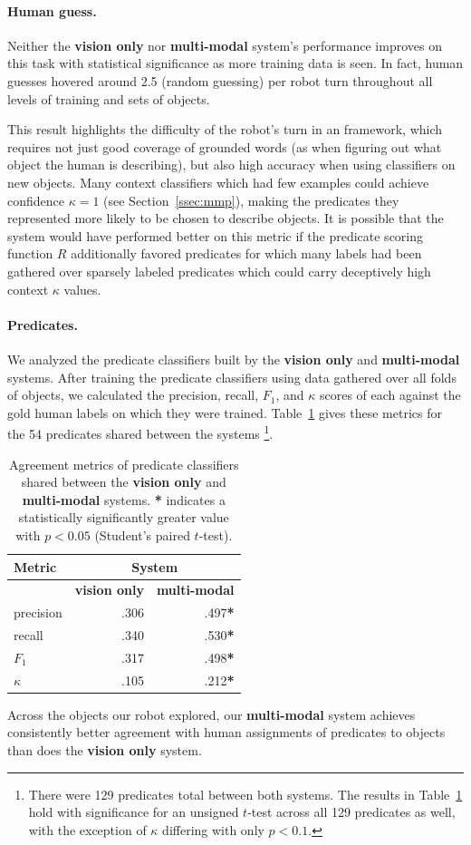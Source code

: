 \paragraph{Human guess.}
Neither the \textbf{vision only} nor \textbf{multi-modal} system's performance improves on this task with statistical significance as more training data is seen.
In fact, human guesses hovered around 2.5 (random guessing) per robot turn throughout all levels of training and sets of objects.

This result highlights the difficulty of the robot's turn in an \ispy framework, which requires not just good coverage of grounded words (as when figuring out what object the human is describing), but also high accuracy when using classifiers on new objects.
Many context classifiers which had few examples could achieve confidence $\kappa=1$ (see Section~\ref{ssec:mmp}), making the predicates they represented more likely to be chosen to describe objects.
It is possible that the system would have performed better on this metric if the predicate scoring function $R$ additionally favored predicates for which many labels had been gathered over sparsely labeled predicates which could carry deceptively high context $\kappa$ values.

\paragraph{Predicates.}
We analyzed the predicate classifiers built by the \textbf{vision only} and \textbf{multi-modal} systems.
After training the predicate classifiers using data gathered over all folds of objects, we calculated the precision, recall, $F_1$, and $\kappa$ scores of each against the gold human labels on which they were trained.
Table~\ref{tab:predicate_results} gives these metrics for the 54 predicates shared between the systems
\footnote{There were 129 predicates total between both systems.
The results in Table~\ref{tab:predicate_results} hold with significance for an unsigned $t$-test across all 129 predicates as well, with the exception of $\kappa$ differing with only $p<0.1$.}.

\begin{table}
\centering
\begin{tabular}[h]{|l|r|r|}
	\hline
	\bf Metric & \multicolumn{2}{c|}{\bf System} \\ \hline \hline
	& \bf vision only & \bf multi-modal \\ \hline
	precision & .306 & .497\textbf{*} \\
	recall & .340 & .530\textbf{*} \\
	\bf $F_1$ & .317 & .498\textbf{*} \\
	\bf $\kappa$ & .105 & .212\textbf{*} \\ \hline
\end{tabular}
\caption{Agreement metrics of predicate classifiers shared between the \textbf{vision only} and \textbf{multi-modal} systems.
\textbf{*} indicates a statistically significantly greater value with $p<0.05$ (Student's paired $t$-test).}
\label{tab:predicate_results}
\end{table}

Across the objects our robot explored, our \textbf{multi-modal} system achieves consistently better agreement with human assignments of predicates to objects than does the \textbf{vision only} system.